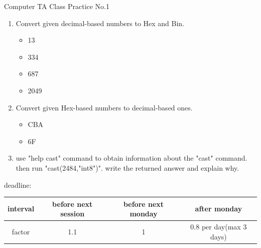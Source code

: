\documentclass[12pt]{article}
\begin{document}
	\vspace*{-2cm}
	\begin{center}
		\Large
		Computer TA Class Practice No.1
	\end{center}	
	\vspace*{1cm}
	\begin{enumerate}
		\item Convert given decimal-based numbers to Hex and Bin.
		\begin{itemize}
			\item 13
			\item 334
			\item 687
			\item 2049
			
		\end{itemize}
		
		\item Convert given Hex-based numbers to decimal-based ones.
		\begin{itemize}
			\item CBA
			\item 6F
		\end{itemize}
		
		\item use "help cast" command to obtain information about the "cast" command. then run "cast(2484,"int8")". write the returned answer and explain why.
	\end{enumerate}
	\vspace*{2cm}
	
	\large
	deadline:
	\\ 
	
	\begin{table}[h]
		\large
	\begin{center}
	\begin{tabular}{c|c|c|c}
		 interval& before next session & before next monday& after monday \\
		\hline
			factor		& 1.1&1&0.8 per day(max 3 days)
	\end{tabular}
	\end{center}
	\end{table}
\end{document}
